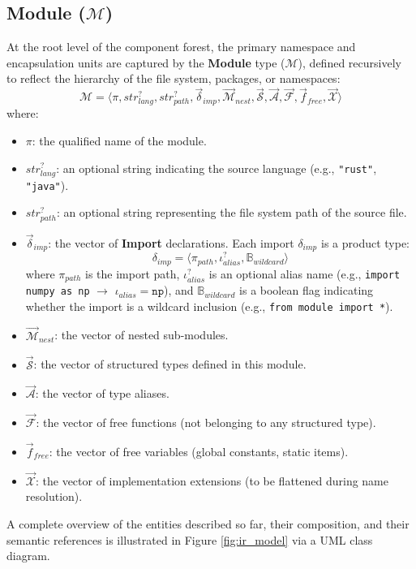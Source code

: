 \subsection{Module ($\mathcal{M}$)}
\label{sec:module_def}
At the root level of the component forest, the primary namespace and
encapsulation units are captured by the \textbf{Module} type ($\mathcal{M}$),
defined recursively to reflect the hierarchy of the file system, packages,
or namespaces:
$$\mathcal{M} = \langle \pi, str_{lang}^?, str_{path}^?,
\vec{\delta}_{imp}, \vec{\mathcal{M}}_{nest}, \vec{\mathcal{S}},
\vec{\mathcal{A}}, \vec{\mathcal{F}}, \vec{f}_{free},
\vec{\mathcal{X}} \rangle$$
where:
\begin{itemize}
  \item $\pi$: the qualified name of the module.
  \item $str_{lang}^?$: an optional string indicating the source
    language (e.g., \texttt{"rust"}, \texttt{"java"}).
  \item $str_{path}^?$: an optional string representing the file
    system path of the source file.
  \item $\vec{\delta}_{imp}$: the vector of \textbf{Import}
    declarations. Each import $\delta_{imp}$ is a product type:
    $$\delta_{imp} = \langle \pi_{path}, \iota_{alias}^?,
    \mathbb{B}_{wildcard} \rangle$$
    where $\pi_{path}$ is the import path,
    $\iota_{alias}^?$ is an optional alias name (e.g.,
    \texttt{import numpy as np} $\to$ $\iota_{alias} = \texttt{np}$),
    and $\mathbb{B}_{wildcard}$ is a boolean flag indicating whether
    the import is a wildcard inclusion (e.g., \texttt{from module
    import *}).
  \item $\vec{\mathcal{M}}_{nest}$: the vector of nested sub-modules.
  \item $\vec{\mathcal{S}}$: the vector of structured types defined
    in this module.
  \item $\vec{\mathcal{A}}$: the vector of type aliases.
  \item $\vec{\mathcal{F}}$: the vector of free functions (not
    belonging to any structured type).
  \item $\vec{f}_{free}$: the vector of free variables (global
    constants, static items).
  \item $\vec{\mathcal{X}}$: the vector of implementation extensions
    (to be flattened during name resolution).
\end{itemize}

A complete overview of the entities described so far, their
composition, and their semantic references is illustrated in Figure
\ref{fig:ir_model} via a UML class diagram.

